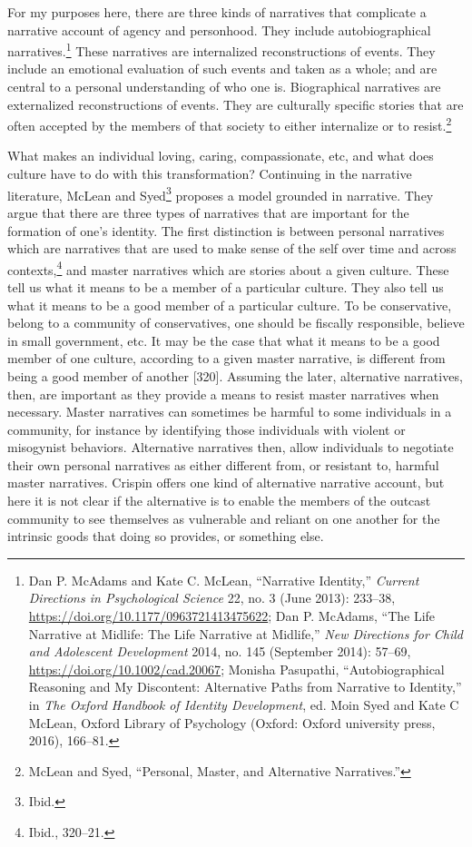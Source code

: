 \documentclass[phdthesis,12pt,final,a4paper]{wuthesis}
\theoremstyle{definition}
\theoremstyle{definition}
\theoremstyle{definition}
\theoremstyle{definition}
\theoremstyle{remark}
\begin{document}
For my purposes here, there are three kinds of narratives that complicate a narrative account of agency and personhood. They include autobiographical narratives.\footnote{Dan P. McAdams and Kate C. McLean, {``Narrative {Identity},''} \emph{Current Directions in Psychological Science} 22, no. 3 (June 2013): 233--38, \url{https://doi.org/10.1177/0963721413475622}; Dan P. McAdams, {``The {Life Narrative} at {Midlife}: {The Life Narrative} at {Midlife},''} \emph{New Directions for Child and Adolescent Development} 2014, no. 145 (September 2014): 57--69, \url{https://doi.org/10.1002/cad.20067}; Monisha Pasupathi, {``Autobiographical {Reasoning} and {My} {Discontent}: {Alternative Paths} from {Narrative} to {Identity},''} in \emph{The {Oxford} Handbook of Identity Development}, ed. Moin Syed and Kate C McLean, Oxford Library of Psychology (Oxford: Oxford university press, 2016), 166--81.} These narratives are internalized reconstructions of events. They include an emotional evaluation of such events and taken as a whole; and are central to a personal understanding of who one is. Biographical narratives are externalized reconstructions of events. They are culturally specific stories that are often accepted by the members of that society to either internalize or to resist.\footnote{McLean and Syed, {``Personal, {Master}, and {Alternative Narratives}.''}}

What makes an individual loving, caring, compassionate, etc, and what does culture have to do with this transformation? Continuing in the narrative literature, McLean and Syed\footnote{Ibid.} proposes a model grounded in narrative. They argue that there are three types of narratives that are important for the formation of one's identity. The first distinction is between personal narratives which are narratives that are used to make sense of the self over time and across contexts,\footnote{Ibid., 320--21.} and master narratives which are stories about a given culture. These tell us what it means to be a member of a particular culture. They also tell us what it means to be a good member of a particular culture. To be conservative, belong to a community of conservatives, one should be fiscally responsible, believe in small government, etc. It may be the case that what it means to be a good member of one culture, according to a given master narrative, is different from being a good member of another {[}320{]}. Assuming the later, alternative narratives, then, are important as they provide a means to resist master narratives when necessary. Master narratives can sometimes be harmful to some individuals in a community, for instance by identifying those individuals with violent or misogynist behaviors. Alternative narratives then, allow individuals to negotiate their own personal narratives as either different from, or resistant to, harmful master narratives. Crispin offers one kind of alternative narrative account, but here it is not clear if the alternative is to enable the members of the outcast community to see themselves as vulnerable and reliant on one another for the intrinsic goods that doing so provides, or something else.
\end{document}
